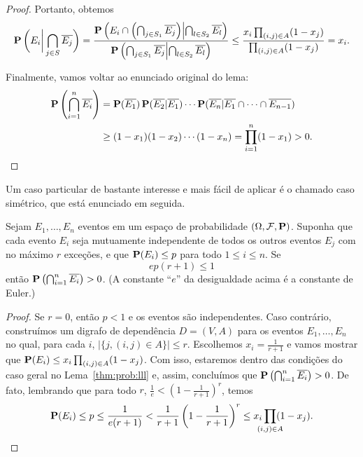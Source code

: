 \begin{proof}
Portanto, obtemos
\begin{align*}
  \operatorname{\mathbf{P}}\bigg( E_i \bigg| \bigcap_{j \in S} \overline{E_j} \bigg) = \frac{\operatorname{\mathbf{P}}\left( E_i \cap \left(\bigcap_{j \in S_1} \overline{E_j} \right) \middle| \bigcap_{l \in S_2} \overline{E_l} \right)}{\operatorname{\mathbf{P}}\left( \bigcap_{j \in S_1} \overline{E_j} \middle| \bigcap_{l \in S_2} \overline{E_l} \right)} \leq \frac{x_i\prod_{(i,j) \in A}(1-x_j)}{\prod_{(i,j) \in A}(1-x_j)} = x_i.
\end{align*}

Finalmente, vamos voltar ao enunciado original do lema:
\begin{align*}
\operatorname{\mathbf{P}} \left( \bigcap_{i = 1}^n \overline{E_i} \right) &= \operatorname{\mathbf{P}} (\overline{E_1}) \operatorname{\mathbf{P}} (\overline{E_2} | \overline{E_1} ) \cdots \operatorname{\mathbf{P}}( \overline{E_n} | \overline{E_1} \cap \dots \cap \overline{E_{n-1}}) \\
&\geq (1 - x_1)(1 - x_2)\cdots(1-x_n) = \prod_{i=1}^n(1 - x_1) > 0. \qedhere
\end{align*}
\end{proof}

Um caso particular de bastante interesse e mais fácil de aplicar é o chamado caso simétrico, que está enunciado em seguida.

\begin{lemma}
\label{thm:prob:llls}
Sejam $E_1, \dots, E_n$ eventos em um espaço de probabilidade $(\Omega, \mathcal{F}, \operatorname{\mathbf{P}})$. Suponha que cada evento $E_i$ seja mutuamente independente de todos os outros eventos $E_j$ com no máximo $r$ exceções, e que $\operatorname{\mathbf{P}}(E_i) \leq p$ para todo $1 \leq i \leq n$. Se
\[ ep(r+1) \leq 1 \]
então $\operatorname{\mathbf{P}} \left( \bigcap_{i = 1}^n \overline{E_i} \right) > 0$. (A constante ``$e$'' da desigualdade acima é a constante de Euler.)
\end{lemma}
\begin{proof}
Se $r = 0$, então $p < 1$ e os eventos são independentes. Caso contrário, construímos um digrafo de dependência $D = (V,A)$ para os eventos $E_1, \dots, E_n$ no qual, para cada $i$, $|\{j, (i,j) \in A\}| \leq r$. Escolhemos $x_i = \frac{1}{r+1}$ e vamos mostrar que $\operatorname{\mathbf{P}} (E_i) \leq x_i \prod_{(i,j) \in A}(1-x_j)$.
Com isso, estaremos dentro das condições do caso geral no Lema~\ref{thm:prob:lll} e, assim, concluímos que $\operatorname{\mathbf{P}} \left( \bigcap_{i = 1}^n \overline{E_i} \right) > 0$. De fato, lembrando que para todo $r$, $\frac{1}{e} < (1 - \frac{1}{r+1})^r$, temos
\[ \prob(E_i) \leq p \leq \frac{1}{e(r+1)} < \frac{1}{r+1}\left(1 - \frac{1}{r+1} \right)^r \leq x_i \prod_{\mathclap{(i,j) \in A}}(1-x_j). \qedhere\]
\end{proof}

